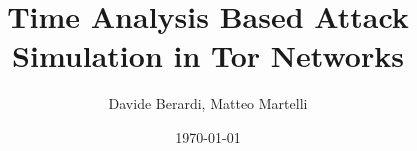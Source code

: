 \documentclass[a4paper]{article}
\title{Time Analysis Based Attack Simulation in Tor Networks}
\author{Davide Berardi, Matteo Martelli}
\date{\today}
\begin{document}
\nocite{*}
\maketitle



\newpage







\end{document}
